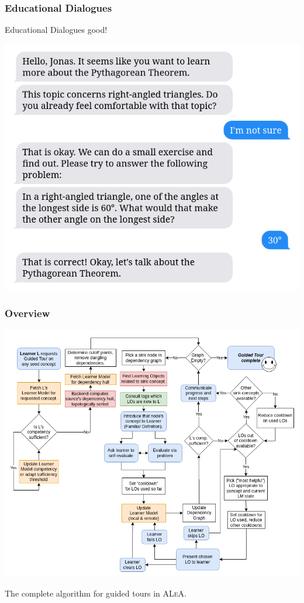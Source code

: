 \documentclass[aspectratio=169, usenames, dvipsnames]{beamer}
\def\ALeA{\textsc{ALeA}\xspace}
\begin{document}
\begin{frame}
\frametitle{Educational Dialogues}
\begin{minipage}{0.4\textwidth}
Educational Dialogues good!
\end{minipage}%
\begin{minipage}{0.6\textwidth}
\includegraphics[height=0.75\textheight,keepaspectratio]{images/bubbles_example_step5} 
\end{minipage}%
\end{frame}

\begin{frame}
\frametitle{Overview}
\begin{minipage}{0.7\textwidth}
\vspace*{-10px}
\includegraphics[height=0.9\textheight,keepaspectratio]{images/gt_algorithm_square}
\end{minipage}%
\begin{minipage}{0.3\textwidth}
The complete algorithm for guided tours in \ALeA.
\end{minipage}%
\end{frame}
\end{document}
